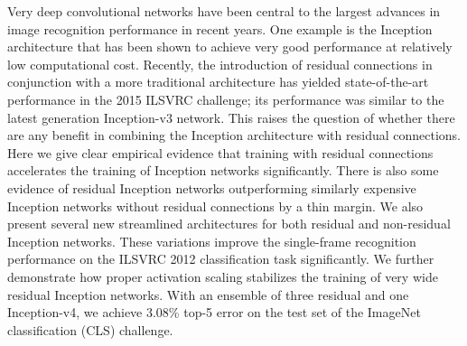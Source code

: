 \documentclass[11pt]{article}
\begin{document}
	Very deep convolutional networks have been central to
	the largest advances in image recognition performance in
	recent years. One example is the Inception architecture that
	has been shown to achieve very good performance at relatively low computational cost. Recently, the introduction
	of residual connections in conjunction with a more traditional architecture has yielded state-of-the-art performance
	in the 2015 ILSVRC challenge; its performance was similar
	to the latest generation Inception-v3 network. This raises
	the question of whether there are any benefit in combining
	the Inception architecture with residual connections. Here
	we give clear empirical evidence that training with residual
	connections accelerates the training of Inception networks
	significantly. There is also some evidence of residual Inception networks outperforming similarly expensive Inception
	networks without residual connections by a thin margin. We
	also present several new streamlined architectures for both
	residual and non-residual Inception networks. These variations improve the single-frame recognition performance on
	the ILSVRC 2012 classification task significantly. We further demonstrate how proper activation scaling stabilizes
	the training of very wide residual Inception networks. With
	an ensemble of three residual and one Inception-v4, we
	achieve 3.08\% top-5 error on the test set of the ImageNet
	classification (CLS) challenge.
	\newpage
	
\end{document}
